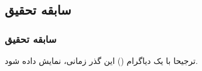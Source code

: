 \label{study_necessity}

\subsection{سابقه تحقیق}
\begin{frame}
\frametitle{سابقه تحقیق}
\pause
ترجیحا با یک دیاگرام () این گذر زمانی، نمایش داده شود.
\end{frame}


